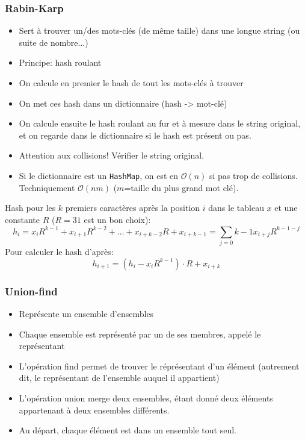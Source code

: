 \documentclass[8pt,aspectratio=169]{beamer}
\begin{document}
\begin{frame}
\frametitle{Rabin-Karp}
\begin{itemize}
	\item Sert à trouver un/des mots-clés (de même taille) dans une longue string (ou suite de nombre...)
	\item Principe: hash roulant
	\item On calcule en premier le hash de tout les mots-clés à trouver
	\item On met ces hash dans un dictionnaire (hash -> mot-clé)
	\item On calcule ensuite le hash roulant au fur et à mesure dans le string original, et on regarde dans le dictionnaire si le hash est présent ou pas.
	\item Attention aux collisions! Vérifier le string original.
	\item Si le dictionnaire est un \texttt{HashMap}, on est en $\mathcal{O}(n)$ si pas trop de collisions. Techniquement $\mathcal{O}(nm)$ ($m$=taille du plus grand mot clé).
\end{itemize}
Hash pour les $k$ premiers caractères après la position $i$ dans le tableau $x$ et une constante $R$ ($R=31$ est un bon choix):
$$h_i = x_i R^{k-1} + x_{i+1} R^{k-2} + \ldots + x_{i+k-2} R + x_{i+k-1} = \sum_{j=0}{k-1} x_{i+j} R^{k-1-j}$$
Pour calculer le hash d'après:
$$h_{i+1} = (h_i - x_i R^{k-1})\cdot R + x_{i+k}$$

\end{frame}

\begin{frame}
\frametitle{Union-find}
\begin{itemize}
	\item Représente un ensemble d'ensembles
	\item Chaque ensemble est représenté par un de ses membres, appelé le représentant
	\item L'opération find permet de trouver le réprésentant d'un élément (autrement dit, le représentant de l'ensemble auquel il appartient)
	\item L'opération union merge deux ensembles, étant donné deux éléments appartenant à deux ensembles différents.
	\item Au départ, chaque élément est dans un ensemble tout seul.
\end{itemize}
\end{frame}
\end{document}
